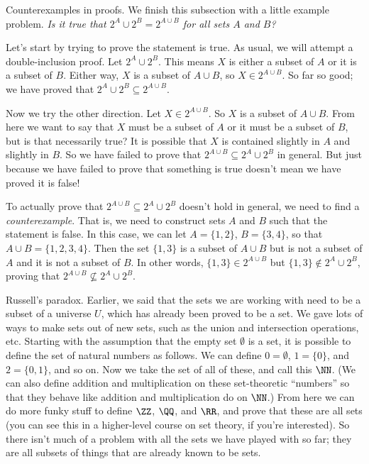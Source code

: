 \medskip\boldlabel Counterexamples in proofs.
We finish this subsection with a little example problem. {\sl Is it true that $2^A \cup 2^B = 2^{A\cup B}$
for all sets $A$ and $B$?}

Let's start by trying to prove the statement is true. As usual, we will attempt a double-inclusion proof.
Let $2^A\cup 2^B$. This means $X$ is either a subset of $A$ or it is a subset of $B$. Either way,
$X$ is a subset of $A\cup B$, so $X\in 2^{A\cup B}$. So far so good; we have proved that
$2^A\cup 2^B \subseteq 2^{A\cup B}$.

Now we try the other direction. Let $X\in 2^{A\cup B}$. So $X$ is a subset of $A\cup B$. From here
we want to say that $X$ must be a subset of $A$ or it must be a subset of $B$, but is that necessarily true?
It is possible that $X$ is contained slightly in $A$ and slightly in $B$. So we have failed
to prove that $2^{A\cup B} \subseteq 2^A \cup 2^B$ in general. But just because we have failed to prove
that something is true doesn't mean we have proved it is false!

To actually prove that $2^{A\cup B} \subseteq 2^A \cup 2^B$ doesn't hold in general, we need to find
a {\it counterexample}. That is, we need to construct sets $A$ and $B$ such that the statement is false.
In this case, we can let $A = \{1,2\}$, $B = \{3,4\}$, so that $A\cup B = \{1,2,3,4\}$.
Then the set $\{1,3\}$ is a subset of $A\cup B$ but is not a subset of $A$ and it is not a subset of $B$.
In other words, $\{1,3\}\in 2^{A\cup B}$ but $\{1,3\} \notin 2^A\cup 2^B$, proving that
$2^{A\cup B} \not\subseteq 2^A \cup 2^B$.

\medskip\boldlabel{} Russell's paradox. Earlier, we said that the sets we are working with
need to be a subset of a universe $U$, which has already been proved to be a set. We gave lots of
ways to make sets out of new sets, such as the union and intersection operations, etc. Starting with
the assumption that the empty set $\emptyset$ is a set,
it is possible to define the set of natural numbers as follows.
We can define $0 = \emptyset$, $1 = \{0\}$, and $2 = \{0,1\}$, and so on.
Now we take the set of all of these, and call this $\NN$.
(We can also define addition and multiplication on these set-theoretic ``numbers''
so that they behave like addition and multiplication do on $\NN$.) From here we can do more funky stuff
to define $\ZZ$, $\QQ$, and $\RR$, and prove that these are all sets (you can see this in a higher-level
course on set theory, if you're interested). So there isn't much of a problem
with all the sets we have played with so far; they are all subsets of things that are already known to be sets.

